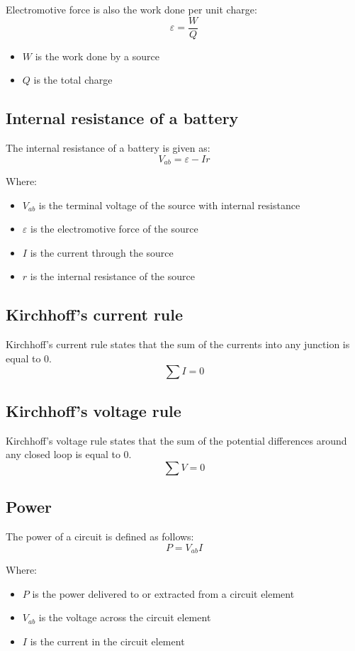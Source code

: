 \documentclass[11pt]{article}
\begin{document}
Electromotive force is also the work done per unit charge:
\[\varepsilon = \frac{W}{Q}\]

\begin{itemize}
\item \(W\) is the work done by a source
\item \(Q\) is the total charge
\end{itemize}
\subsection{Internal resistance of a battery}
\label{sec:org246c08f}
The internal resistance of a battery is given as:
\[V_{ab} = \varepsilon - Ir\]

Where:
\begin{itemize}
\item \(V_{ab}\) is the terminal voltage of the source with internal resistance
\item \(\varepsilon\) is the electromotive force of the source
\item \(I\) is the current through the source
\item \(r\) is the internal resistance of the source
\end{itemize}
\subsection{Kirchhoff's current rule}
\label{sec:org6e74a3d}
Kirchhoff's current rule states that the sum of the currents into any junction is equal to 0.
\[\sum I = 0\]
\subsection{Kirchhoff's voltage rule}
\label{sec:org0814ab2}
Kirchhoff's voltage rule states that the sum of the potential differences around any closed loop is equal to 0.
\[\sum V = 0\]

\newpage
\subsection{Power}
\label{sec:orge9d263a}
The power of a circuit is defined as follows:
\[P = V_{ab} I\]

Where:
\begin{itemize}
\item \(P\) is the power delivered to or extracted from a circuit element
\item \(V_{ab}\) is the voltage across the circuit element
\item \(I\) is the current in the circuit element
\end{itemize}
\end{document}

